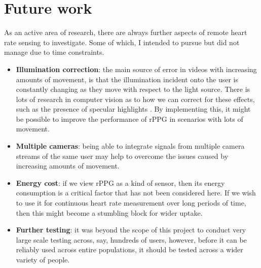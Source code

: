 \section{Future work}
%
As an active area of research, there are always further aspects of remote heart rate sensing to investigate. Some of which, I intended to pursue but did
not manage due to time constraints.
\begin{itemize}
    \item \textbf{Illumination correction}: the main source of error in videos with increasing amounts of movement, is that the illumination incident onto the user is constantly changing 
     as they move with respect to the light source. There is lots of research in computer vision as to how we can correct for these effects, such as the presence of 
     specular highlights \cite{spec1}\cite{spec2}\cite{spec3}. By implementing this, it might be possible to improve the performance of rPPG in scenarios with lots of movement.
     \item \textbf{Multiple cameras}: being able to integrate signals from multiple camera streams of the same user may help to overcome the issues caused by increasing amounts of movement.
    \item \textbf{Energy cost}: if we view rPPG as a kind of sensor, then its energy consumption is a critical factor that has not been considered here. 
    If we wish to use it for continuous heart rate measurement over long periods of time, then this might become a stumbling block for wider uptake.
     \item \textbf{Further testing}: it was beyond the scope of this project to conduct very large scale testing across, say, hundreds of users, however, before it can be reliably used across entire populations, it should be tested across a wider variety of people.
\end{itemize}